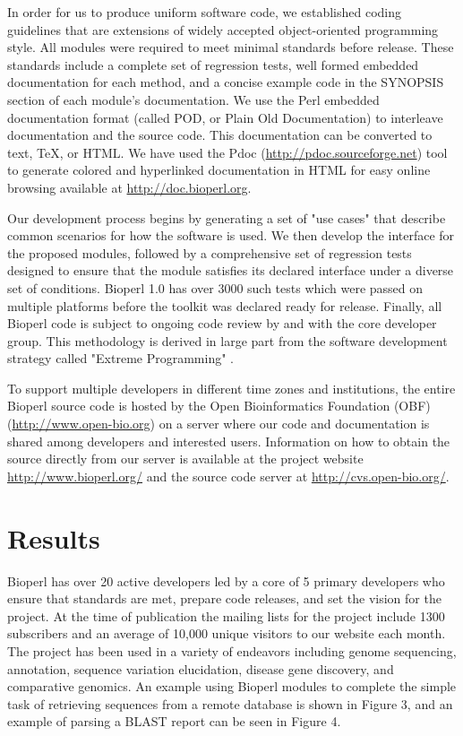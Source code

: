 \documentclass[12pt]{article}
\begin{document}
In order for us to produce uniform software code, we established
coding guidelines that are extensions of widely accepted
object-oriented programming style.  All modules were required to meet
minimal standards before release.  These standards include a complete
set of regression tests, well formed embedded documentation for each
method, and a concise example code in the SYNOPSIS section of each
module's documentation.  We use the Perl embedded documentation format
(called POD, or Plain Old Documentation) to interleave documentation and
the source code.  This documentation can be converted to text, TeX, or
HTML.  We have used the Pdoc (\url{http://pdoc.sourceforge.net}) tool to
generate colored and hyperlinked documentation in HTML for easy
online browsing available at \url{http://doc.bioperl.org}.

Our development process begins by generating a set of "use cases" that
describe common scenarios for how the software is used.  We then
develop the interface for the proposed modules, followed by a
comprehensive set of regression tests designed to ensure that the
module satisfies its declared interface under a diverse set of
conditions.  Bioperl 1.0 has over 3000 such tests which were passed on
multiple platforms before the toolkit was declared ready for release.
Finally, all Bioperl code is subject to ongoing code review by and
with the core developer group.  This methodology is derived in large
part from the software development strategy called "Extreme
Programming" \cite{xprogramming}.

To support multiple developers in different time zones and
institutions, the entire Bioperl source code is hosted by the Open
Bioinformatics Foundation (OBF) (\url{http://www.open-bio.org}) on a
server where our code and documentation is shared among developers and
interested users.  Information on how to obtain the source directly
from our server is available at the project website
\url{http://www.bioperl.org/} and the source code server at
\url{http://cvs.open-bio.org/}.

\section{Results}

Bioperl has over 20 active developers led by a core of 5 primary developers
who ensure that standards are met, prepare code releases, and set the
vision for the project.  At the time of publication the mailing lists
for the project include 1300 subscribers and an average of 10,000
unique visitors to our website each month.  The project has been used
in a variety of endeavors including genome sequencing, annotation,
sequence variation elucidation, disease gene discovery, and
comparative genomics.  An example using Bioperl modules to complete
the simple task of retrieving sequences from a remote database is
shown in Figure 3, and an example of parsing a BLAST report can be
seen in Figure 4.
\end{document}
